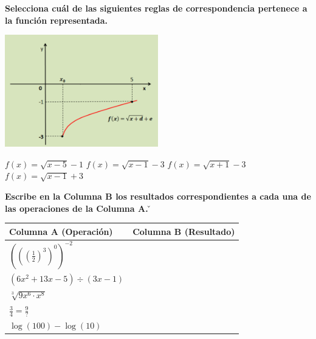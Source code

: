 \documentclass[11pt, addpoints, answers]{exam}
\begin{document}
\begin{questions}
		\question[1] \textbf{Selecciona cuál de las siguientes reglas de correspondencia pertenece a la función representada.}
		\begin{center}
			\includegraphics[width=0.5\textwidth]{image_249683.png}
		\end{center}
		\begin{choices}
			\choice $f(x) = \sqrt{x-5}-1$
			\choice $f(x) = \sqrt{x-1}-3$
			\choice $f(x) = \sqrt{x+1}-3$
			\choice $f(x) = \sqrt{x-1}+3$
		\end{choices}
		
		\question[1] \textbf{Escribe en la Columna B los resultados correspondientes a cada una de las operaciones de la Columna A.}
		\v
		
		\begin{tabularx}{\textwidth}{|>{\RaggedRight\arraybackslash}X|X|}
			\hline
			\textbf{Columna A (Operación)} & \textbf{Columna B (Resultado)} \\
			\hline
			$\left(\left(\left(\frac{1}{2}\right)^3\right)^0\right)^{-2}$ & \\
			\hline
			$(6x^2+13x-5) \div (3x-1)$ & \\
			\hline
			$\sqrt[3]{9x^6 \cdot x^8}$ & \\
			\hline
			$\frac{3}{4} = \frac{9}{?}$ & \\
			\hline
			$\log(100) - \log(10)$ & \\
			\hline
		\end{tabularx}
		
	\end{questions}
\end{document}
